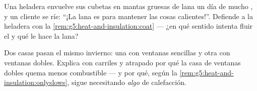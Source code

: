 \begin{exercise}[$\star\star$]\label{exo:g5:heat-and-insulation:10}
Una heladera envuelve sus cubetas en mantas gruesas de lana un día de
mucho , y un cliente se ríe: ``¡La lana es para mantener las
cosas calientes!''. Defiende a la heladera con la
\cref{rem:g5:heat-and-insulation:coat} --- ¿en qué sentido intenta
fluir el  y qué le hace la lana?
\end{exercise}

\begin{exercise}[$\star\star$]\label{exo:g5:heat-and-insulation:11}
Dos casas pasan el mismo invierno: una con ventanas sencillas y otra
con ventanas dobles. Explica con carriles y  atrapado por qué la
casa de ventanas dobles quema menos combustible --- y por qué, según
la \cref{rem:g5:heat-and-insulation:onlyslows}, sigue necesitando
\emph{algo} de calefacción.
\end{exercise}
